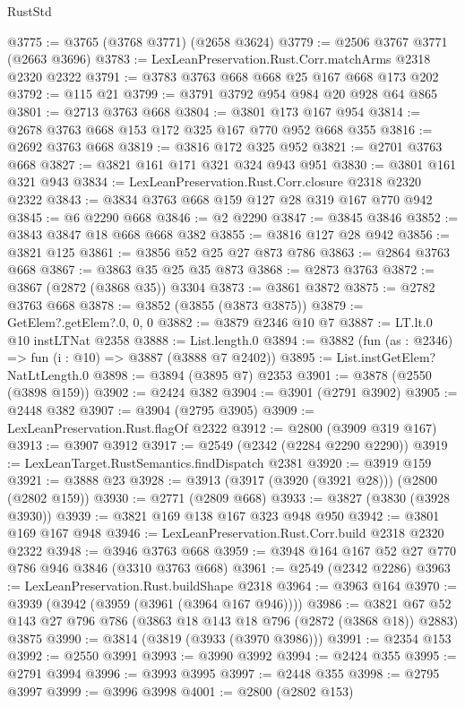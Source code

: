 \begin{lexlean}{RustStd}
\begin{coremodule}
@3775 := @3765 (@3768 @3771) (@2658 @3624)
@3779 := @2506 @3767 @3771 (@2663 @3696)
@3783 := LexLeanPreservation.Rust.Corr.matchArms @2318 @2320 @2322
@3791 := @3783 @3763 @668 @668 @25 @167 @668 @173 @202
@3792 := @115 @21
@3799 := @3791 @3792 @954 @984 @20 @928 @64 @865
@3801 := @2713 @3763 @668
@3804 := @3801 @173 @167 @954
@3814 := @2678 @3763 @668 @153 @172 @325 @167 @770 @952 @668 @355
@3816 := @2692 @3763 @668
@3819 := @3816 @172 @325 @952
@3821 := @2701 @3763 @668
@3827 := @3821 @161 @171 @321 @324 @943 @951
@3830 := @3801 @161 @321 @943
@3834 := LexLeanPreservation.Rust.Corr.closure @2318 @2320 @2322
@3843 := @3834 @3763 @668 @159 @127 @28 @319 @167 @770 @942
@3845 := @6 @2290 @668
@3846 := @2 @2290
@3847 := @3845 @3846
@3852 := @3843 @3847 @18 @668 @668 @382
@3855 := @3816 @127 @28 @942
@3856 := @3821 @125
@3861 := @3856 @52 @25 @27 @873 @786
@3863 := @2864 @3763 @668
@3867 := @3863 @35 @25 @35 @873
@3868 := @2873 @3763
@3872 := @3867 (@2872 (@3868 @35)) @3304
@3873 := @3861 @3872
@3875 := @2782 @3763 @668
@3878 := @3852 (@3855 (@3873 @3875))
@3879 := GetElem?.getElem?.{0, 0, 0}
@3882 := @3879 @2346 @10 @7
@3887 := LT.lt.{0} @10 instLTNat @2358
@3888 := List.length.{0}
@3894 := @3882 (fun (as : @2346) => fun (i : @10) => @3887 (@3888 @7 @2402))
@3895 := List.instGetElem?NatLtLength.{0}
@3898 := @3894 (@3895 @7) @2353
@3901 := @3878 (@2550 (@3898 @159))
@3902 := @2424 @382
@3904 := @3901 (@2791 @3902)
@3905 := @2448 @382
@3907 := @3904 (@2795 @3905)
@3909 := LexLeanPreservation.Rust.flagOf @2322
@3912 := @2800 (@3909 @319 @167)
@3913 := @3907 @3912
@3917 := @2549 (@2342 (@2284 @2290 @2290))
@3919 := LexLeanTarget.RustSemantics.findDispatch @2381
@3920 := @3919 @159
@3921 := @3888 @23
@3928 := @3913 (@3917 (@3920 (@3921 @28))) (@2800 (@2802 @159))
@3930 := @2771 (@2809 @668)
@3933 := @3827 (@3830 (@3928 @3930))
@3939 := @3821 @169 @138 @167 @323 @948 @950
@3942 := @3801 @169 @167 @948
@3946 := LexLeanPreservation.Rust.Corr.build @2318 @2320 @2322
@3948 := @3946 @3763 @668
@3959 := @3948 @164 @167 @52 @27 @770 @786 @946 @3846 (@3310 @3763 @668)
@3961 := @2549 (@2342 @2286)
@3963 := LexLeanPreservation.Rust.buildShape @2318
@3964 := @3963 @164
@3970 := @3939 (@3942 (@3959 (@3961 (@3964 @167 @946))))
@3986 := @3821 @67 @52 @143 @27 @796 @786 (@3863 @18 @143 @18 @796 (@2872 (@3868 @18)) @2883) @3875
@3990 := @3814 (@3819 (@3933 (@3970 @3986)))
@3991 := @2354 @153
@3992 := @2550 @3991
@3993 := @3990 @3992
@3994 := @2424 @355
@3995 := @2791 @3994
@3996 := @3993 @3995
@3997 := @2448 @355
@3998 := @2795 @3997
@3999 := @3996 @3998
@4001 := @2800 (@2802 @153)

\end{coremodule}
\end{lexlean}
